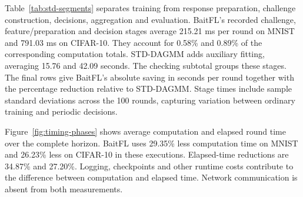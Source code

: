 \documentclass[journal]{IEEEtran}
\begin{document}
Table~\ref{tab:std-segments} separates training from response preparation,
challenge construction, decisions, aggregation and evaluation. BaitFL's
recorded challenge, feature/preparation and decision stages average
215.21 ms per round on MNIST and
791.03 ms on CIFAR-10. They account for 0.58\% and
0.89\% of the corresponding computation totals. STD-DAGMM adds auxiliary
fitting, averaging 15.76 and 42.09 seconds.
The checking subtotal groups these stages. The final rows give BaitFL's
absolute saving in seconds per round together with the percentage
reduction relative to STD-DAGMM. Stage times include sample standard
deviations across the 100 rounds, capturing variation between ordinary
training and periodic decisions.

Figure~\ref{fig:timing-phases} shows average
computation and elapsed round time over the complete horizon. BaitFL uses
29.35\% less computation time on MNIST and
26.23\% less on CIFAR-10 in these executions. Elapsed-time
reductions are 34.87\% and
27.20\%. Logging, checkpoints and other runtime costs
contribute to the difference between computation and elapsed time. Network
communication is absent from both measurements.
\end{document}
